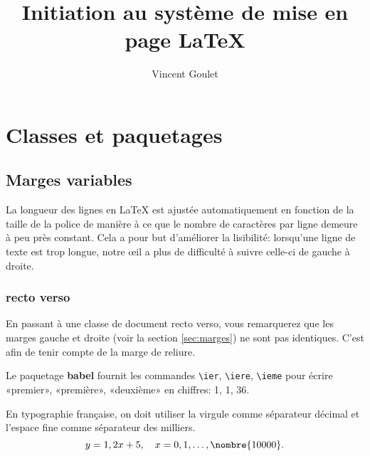 \documentclass[11pt,french]{memoir}
\title{Initiation au système de mise en page \LaTeX}
\author{Vincent Goulet}
\begin{document}
\maketitle

\chapter{Classes et paquetages}
\label{chap:classes}

\section{Marges variables}
\label{sec:classes:marges}

La longueur des lignes en {\LaTeX} est ajustée automatiquement en
fonction de la taille de la police de manière à ce que le nombre de
caractères par ligne demeure à peu près constant. Cela a pour but
d'améliorer la lisibilité: lorsqu'une ligne de texte est trop longue,
notre œil a plus de difficulté à suivre celle-ci de gauche à droite.

\subsection{recto verso}
\label{sec:classes:marges:recto verso}

En passant à une classe de document recto verso, vous remarquerez que
les marges gauche et droite (voir la section \ref{sec:marges}) ne sont
pas identiques. C'est afin de tenir compte de la marge de reliure.

Le paquetage \textbf{babel} fournit les commandes \verb=\ier=,
\verb=\iere=, \verb=\ieme= pour écrire «premier», «première»,
«deuxième» en chiffres: 1{\ier}, 1{\iere}, 36{\ieme}.

En typographie française, on doit utiliser la virgule comme séparateur
décimal et l'espace fine comme séparateur des milliers.
\begin{displaymath}
  y = 1,2x + 5, \quad x = 0, 1, \dots, \nombre{10 000}.
\end{displaymath}
\end{document}
